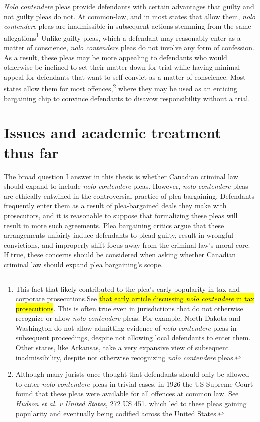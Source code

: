 \textit{Nolo contendere} pleas provide defendants with certain advantages that guilty and not guilty pleas do not. At common-law, and in most states that allow them, \textit{nolo contendere} pleas are inadmissible in subsequent actions stemming from the same allegations\footnote{This fact that likely contributed to the plea's early popularity in tax and corporate prosecutions.See \hl{that early article discussing \textit{nolo contendere} in tax prosecutions}. This is often true even in jurisdictions that do not otherwise recognize or allow \textit{nolo contendere} pleas. For example, North Dakota and Washington do not allow admitting evidence of \textit{nolo contendere} pleas in subsequent proceedings, despite not allowing local defendants to enter them. Other states, like Arkansas, take a very expansive view of subsequent inadmissibility, despite not otherwise recognizing \textit{nolo contendere} pleas.} Unlike guilty pleas, which a defendant may reasonably enter as a matter of conscience, \textit{nolo contendere} pleas do not involve any form of confession. As a result, these pleas may be more appealing to defendants who would otherwise be inclined to set their matter down for trial while having minimal appeal for defendants that want to self-convict as a matter of conscience. Most states allow them for most offences,\footnote{Although many jurists once thought that defendants should only be allowed to enter \textit{nolo contendere} pleas in trivial cases, in 1926 the US Supreme Court found that these pleas were available for all offences at common law. See \textit{Hudson et al. v United States}, 272 US 451. which led to these pleas gaining popularity and eventually being codified across the United States.} where they may be used as an enticing bargaining chip to convince defendants to disavow responsibility without a trial.

\section{Issues and academic treatment thus far}

The broad question I answer in this thesis is whether Canadian criminal law should expand to include \textit{nolo contendere} pleas. However, \textit{nolo contendere} pleas are ethically entwined in the controversial practice of plea bargaining. Defendants frequently enter them as a result of plea-bargained deals they make with prosecutors, and it is reasonable to suppose that formalizing these pleas will result in more such agreements. Plea bargaining critics argue that these arrangements unfairly induce defendants to plead guilty, result in wrongful convictions, and improperly shift focus away from the criminal law's moral core. If true, these concerns should be considered when asking whether Canadian criminal law should expand plea bargaining's scope.

